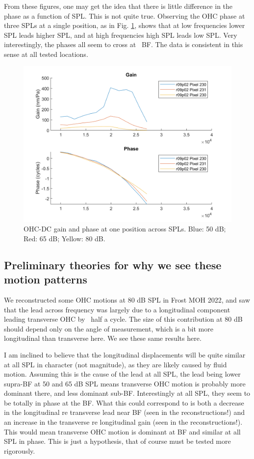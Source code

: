 \documentclass{article}
\begin{document}
\par{From these figures, one may get the idea that there is little difference in the phase as a function of SPL. This is not quite true. Observing the OHC phase at three SPLs at a single position, as in Fig. \ref{ohcdcspls}, shows that at low frequencies lower SPL leads higher SPL, and at high frequencies high SPL leads low SPL. Very interestingly, the phases all seem to cross at ~BF. The data is consistent in this sense at all tested locations.}

\begin{figure}
	\centering
	\includegraphics[width=.7\textwidth]{Figures/ohcdcspls.png}
	\caption{OHC-DC gain and phase at one position across SPLs. Blue: 50 dB; Red: 65 dB; Yellow: 80 dB.}
	\label{ohcdcspls}
\end{figure}

\subsection{Preliminary theories for why we see these motion patterns}
\par{We reconstructed some OHC motions at 80 dB SPL in Frost MOH 2022, and saw that the lead across frequency was largely due to a longitudinal component leading transverse OHC by ~half a cycle. The size of this contribution at 80 dB should depend only on the angle of measurement, which is a bit more longitudinal than transverse here. We see these same results here.}

\par{I am inclined to believe that the longitudinal displacements will be quite similar at all SPL in character (not magnitude), as they are likely caused by fluid motion. Assuming this is the cause of the lead at all SPL, the lead being lower supra-BF at 50 and 65 dB SPL means transverse OHC motion is probably more dominant there, and less dominant sub-BF. Interestingly at all SPL, they seem to be totally in phase at the BF. What this could correspond to is both a decrease in the longitudinal re transverse lead near BF (seen in the reconstructions!) and an increase in the transverse re longitudinal gain (seen in the reconstructions!). This would mean transverse OHC motion is dominant at BF and similar at all SPL in phase. This is just a hypothesis, that of course must be tested more rigorously.}
\end{document}
